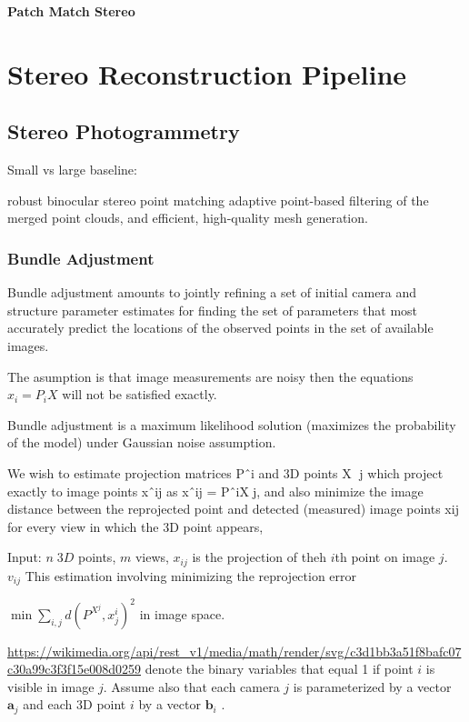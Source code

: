 \textbf{Patch Match Stereo}


\section{Stereo Reconstruction Pipeline}

\subsection{Stereo Photogrammetry}

Small vs large baseline:

robust binocular stereo
point matching
adaptive point-based filtering of the
merged point clouds, and efficient, high-quality mesh generation.

\subsubsection{Bundle Adjustment}

Bundle adjustment amounts to jointly refining a set of initial camera and structure parameter estimates for finding the set of parameters that most accurately predict the locations of the observed points in the set of available images. 

The asumption is that image measurements are noisy then the equations $x_i = P_i X$ will not be satisfied exactly. 

Bundle adjustment is a maximum likelihood solution (maximizes the probability of the model) under Gaussian  noise assumption. 

We wish to estimate projection matrices Pˆi and 3D points X􏰟 j which project exactly to image points
xˆij as xˆij = PˆiX􏰟j, and also minimize the image distance between the reprojected point and detected (measured) image points xij for every view in which the 3D point appears,

Input: $n \; 3D$ points, $m$ views, $x_{ij}$ is the projection of theh $i$th point on image $j$. $v_{ij}$
This estimation involving minimizing the reprojection error 

$\min \sum_{i,j} d(P^X^j, x_j^i)^2 $ in image space.

\url{https://wikimedia.org/api/rest_v1/media/math/render/svg/c3d1bb3a51f8bafc07c30a99c3f3f15e008d0259}
 denote the binary variables that equal 1 if point $i$ is visible in image $j$. Assume also that each camera $j$  is parameterized by a vector $\mathbf{a}_{j}$ and each 3D point $i$ by a vector $\mathbf{b}_{i}$ . 

